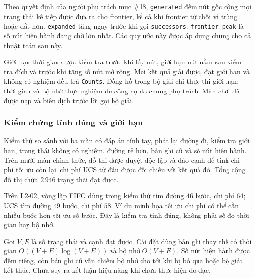Theo quyết định của người phụ trách mục \#18, \texttt{generated} đếm nút
gốc cộng mọi trạng thái kế tiếp được đưa ra cho frontier, kể cả khi frontier
từ chối vì trùng hoặc đắt hơn. \texttt{expanded} tăng ngay trước khi gọi
\texttt{successors}. \texttt{frontier\_peak} là số nút hiện hành đang chờ lớn
nhất. Các quy ước này được áp dụng chung cho cả thuật toán sau này.

Giới hạn thời gian được kiểm tra trước khi lấy nút; giới hạn nút nằm sau
kiểm tra đích và trước khi tăng số nút mở rộng. Mọi kết quả giải được, đạt
giới hạn và không có nghiệm đều trả \texttt{Counts}. Đồng hồ trong bộ giải
chỉ thực thi giới hạn; thời gian và bộ nhớ thực nghiệm do công cụ đo chung
phụ trách. Màn chơi đã được nạp và biên dịch trước lời gọi bộ giải.

\subsubsection{Kiểm chứng tính đúng và giới hạn}
Kiểm thử so sánh với ba màn có đáp án tính tay, phát lại đường đi, kiểm tra
giới hạn, trạng thái không có nghiệm, đường rẻ hơn, bản ghi cũ và số nút
hiện hành. Trên mười màn chính thức, đồ thị được duyệt độc lập và đảo cạnh
để tính chi phí tối ưu còn lại; chi phí UCS từ đầu được đối chiếu với kết
quả đó. Tổng cộng đồ thị chứa $2\,946$ trạng thái đạt được.

Trên L2-02, vòng lặp FIFO dùng trong kiểm thử tìm đường $46$ bước, chi phí
$64$; UCS tìm đường $49$ bước, chi phí $58$. Ví dụ minh họa tối ưu chi phí
có thể cần nhiều bước hơn tối ưu số bước. Đây là kiểm tra tính đúng, không
phải số đo thời gian hay bộ nhớ.

Gọi $V,E$ là số trạng thái và cạnh đạt được. Cài đặt dùng bản ghi thay thế
có thời gian $O((V+E)\log(V+E))$ và bộ nhớ $O(V+E)$. Số nút hiện hành được
đếm riêng, còn bản ghi cũ vẫn chiếm bộ nhớ cho tới khi bị bỏ qua hoặc bộ
giải kết thúc. Chưa suy ra kết luận hiệu năng khi chưa thực hiện đo đạc.
